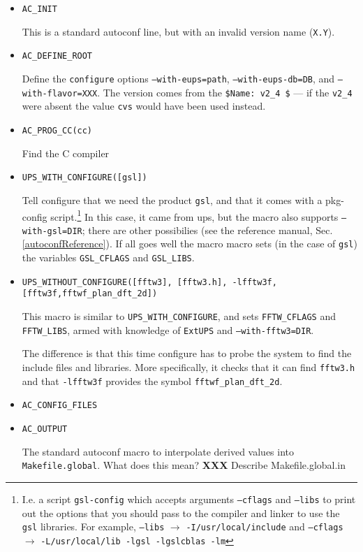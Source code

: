 \documentclass{article}
\newcommand{\XXX}[1]{\textbf{XXX} #1}
\newcommand{\code}[1]{\texttt{#1}}
\newcommand{\file}[1]{\texttt{#1}}
\newcommand{\eups}{\code{ExtUPS}}
\begin{document}
\begin{itemize}
  \item{\code{AC\_INIT}}

    This is a standard autoconf line, but with an invalid version name (\code{X.Y}).

  \item{\code{AC\_DEFINE\_ROOT}}

    Define the \code{configure} options \code{--with-eups=path},
    \code{--with-eups-db=DB}, and \code{--with-flavor=XXX}. The
    version comes from the \code{\${Name}: v2\_4 \$} --- if the
    \code{v2\_4} were absent the value \code{cvs} would have been used
    instead.

  \item\code{AC\_PROG\_CC(cc)}

    Find the C compiler    

  \item\code{UPS\_WITH\_CONFIGURE([gsl])}

    Tell configure that we need the product \code{gsl}, and that it
    comes with a pkg-config script.\footnote{%
      I.e. a script \code{gsl-config} which accepts arguments \code{--cflags}
      and \code{--libs} to print out the options that you should pass to the
      compiler and linker to use the \code{gsl} libraries. For example,
      \code{--libs} $\rightarrow$ \code{-I/usr/local/include} and
      \code{--cflags} $\rightarrow$ \code{-L/usr/local/lib -lgsl -lgslcblas -lm}
      }
    In this case, it came from ups,
    but the macro also supports \code{--with-gsl=DIR}; there are
    other possibilies (see the reference manual,
    Sec. \ref{autoconfReference}).  If all goes well the macro macro sets (in the
    case of \code{gsl}) the variables \code{GSL\_CFLAGS} and \code{GSL\_LIBS}.

  \item\code{UPS\_WITHOUT\_CONFIGURE([fftw3], [fftw3.h], -lfftw3f, [fftw3f,fftwf\_plan\_dft\_2d])}

    This macro is similar to \code{UPS\_WITH\_CONFIGURE}, and sets
    \code{FFTW\_CFLAGS} and \code{FFTW\_LIBS}, armed with knowledge of
    \eups{} and  \code{--with-fftw3=DIR}.

    The difference is that this time configure has to probe the system
    to find the include files and libraries.  More specifically, it
    checks that it can find \code{fftw3.h} and that \code{-lfftw3f} provides the symbol
    \code{fftwf\_plan\_dft\_2d}.
    
  \item\code{AC\_CONFIG\_FILES}
  \item\code{AC\_OUTPUT}

    The standard autoconf macro to interpolate derived values
    into \file{Makefile.global}.  What does this mean?
    \XXX{Describe Makefile.global.in}
\end{itemize}
\end{document}
